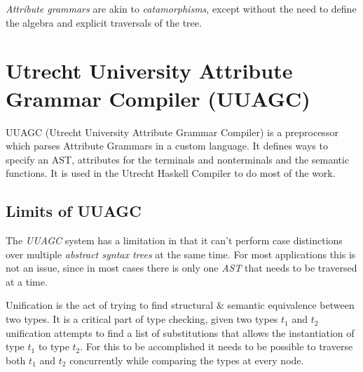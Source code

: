 \documentclass[twoside, titlepage, openright, a4paper]{book}
\newcommand{\Ags}{\emph{Attribute grammars }}
\begin{document}
\Ags are akin to \emph{catamorphisms}, except without the need to define the algebra and explicit traversals of the tree.

\section{Utrecht University Attribute Grammar Compiler (UUAGC)}
UUAGC (Utrecht University Attribute Grammar Compiler) is a preprocessor which parses Attribute Grammars in a custom language.
It defines ways to specify an AST, attributes for the terminals and nonterminals and the semantic functions. It is used in the Utrecht Haskell Compiler to do most of the work.

\subsection{Limits of UUAGC}
The \emph{UUAGC} system has a limitation in that it can't perform case distinctions over multiple \emph{abstract syntax trees} at the same time\cite{visitag}. For most applications this is not an issue, since in most cases there is only one \emph{AST} that needs to be traversed at a time. 

Unification is the act of trying to find structural \& semantic equivalence between two types. It is a critical part of type checking, given two types \emph{$t_{1}$} and \emph{$t_{2}$} unification attempts to find a list of substitutions that allows the instantiation of type \emph{$t_{1}$} to type \emph{$t_{2}$}. For this to be accomplished it needs to be possible to traverse both \emph{$t_{1}$} and \emph{$t_{2}$} concurrently while comparing the types at every node.

%
%    
%
\end{document}
